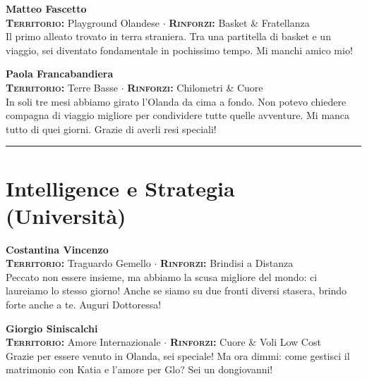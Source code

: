 \noindent\begin{minipage}{\linewidth}
\textbf{Matteo Fascetto} \\
{\footnotesize \textbf{\textsc{Territorio:}} Playground Olandese $\cdot$ \textbf{\textsc{Rinforzi:}} Basket \& Fratellanza} \\
Il primo alleato trovato in terra straniera. Tra una partitella di basket e un viaggio, sei diventato fondamentale in pochissimo tempo. Mi manchi amico mio!
\end{minipage}
\vspace{0.6cm}

\noindent\begin{minipage}{\linewidth}
\textbf{Paola Francabandiera} \\
{\footnotesize \textbf{\textsc{Territorio:}} Terre Basse $\cdot$ \textbf{\textsc{Rinforzi:}} Chilometri \& Cuore} \\
In soli tre mesi abbiamo girato l'Olanda da cima a fondo. Non potevo chiedere compagna di viaggio migliore per condividere tutte quelle avventure. Mi manca tutto di quei giorni. Grazie di averli resi speciali!
\end{minipage}

\vspace{0.6cm}
\begin{center} \rule{0.5\linewidth}{0.5pt} \end{center}

\section*{Intelligence e Strategia (Università)}

\noindent\begin{minipage}{\linewidth}
\textbf{Costantina Vincenzo} \\
{\footnotesize \textbf{\textsc{Territorio:}} Traguardo Gemello $\cdot$ \textbf{\textsc{Rinforzi:}} Brindisi a Distanza} \\
Peccato non essere insieme, ma abbiamo la scusa migliore del mondo: ci laureiamo lo stesso giorno! Anche se siamo su due fronti diversi stasera, brindo forte anche a te. Auguri Dottoressa!
\end{minipage}
\vspace{0.6cm}

\noindent\begin{minipage}{\linewidth}
\textbf{Giorgio Siniscalchi} \\
{\footnotesize \textbf{\textsc{Territorio:}} Amore Internazionale $\cdot$ \textbf{\textsc{Rinforzi:}} Cuore \& Voli Low Cost} \\
Grazie per essere venuto in Olanda, sei speciale! Ma ora dimmi: come gestisci il matrimonio con Katia e l'amore per Glo? Sei un dongiovanni!
\end{minipage}
\vspace{0.6cm}

